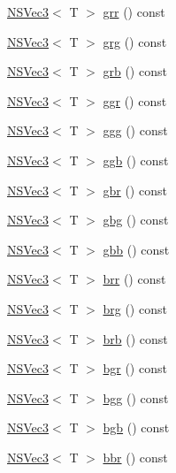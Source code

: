 \begin{DoxyCompactItemize}
\item 
\hyperlink{structNSVec3}{N\-S\-Vec3}$<$ T $>$ \hyperlink{structNSVec3_addbc52814a2aef9949cc2ff4ddc6ba97}{grr} () const 
\item 
\hyperlink{structNSVec3}{N\-S\-Vec3}$<$ T $>$ \hyperlink{structNSVec3_aea835c378065a68c2279c1ec5879f0b4}{grg} () const 
\item 
\hyperlink{structNSVec3}{N\-S\-Vec3}$<$ T $>$ \hyperlink{structNSVec3_a9a398119dc7c29f05c1844c232353f1d}{grb} () const 
\item 
\hyperlink{structNSVec3}{N\-S\-Vec3}$<$ T $>$ \hyperlink{structNSVec3_a94b3cd4633e9a3a47e2d1785446600b8}{ggr} () const 
\item 
\hyperlink{structNSVec3}{N\-S\-Vec3}$<$ T $>$ \hyperlink{structNSVec3_a790c174c59095fb40fd02d9382e29a25}{ggg} () const 
\item 
\hyperlink{structNSVec3}{N\-S\-Vec3}$<$ T $>$ \hyperlink{structNSVec3_add295dbe56bda5a4d633661183238b16}{ggb} () const 
\item 
\hyperlink{structNSVec3}{N\-S\-Vec3}$<$ T $>$ \hyperlink{structNSVec3_a5159f1ccd1faad4bad757819a5b29930}{gbr} () const 
\item 
\hyperlink{structNSVec3}{N\-S\-Vec3}$<$ T $>$ \hyperlink{structNSVec3_ae72e9d997d90ff3cdec0a55c97fa2745}{gbg} () const 
\item 
\hyperlink{structNSVec3}{N\-S\-Vec3}$<$ T $>$ \hyperlink{structNSVec3_aca3f87e3640573d7ace488c4b1bd4c27}{gbb} () const 
\item 
\hyperlink{structNSVec3}{N\-S\-Vec3}$<$ T $>$ \hyperlink{structNSVec3_a439db831b4883541748c3af1acf286e9}{brr} () const 
\item 
\hyperlink{structNSVec3}{N\-S\-Vec3}$<$ T $>$ \hyperlink{structNSVec3_aca534d8f65704a1e8df53e8f9ab48aff}{brg} () const 
\item 
\hyperlink{structNSVec3}{N\-S\-Vec3}$<$ T $>$ \hyperlink{structNSVec3_ade69823278092a1a55b7b64ac9e97b5b}{brb} () const 
\item 
\hyperlink{structNSVec3}{N\-S\-Vec3}$<$ T $>$ \hyperlink{structNSVec3_ae7bd2e1f4490f4991cfc222f70450828}{bgr} () const 
\item 
\hyperlink{structNSVec3}{N\-S\-Vec3}$<$ T $>$ \hyperlink{structNSVec3_aac661fa406ab8a160ff79baaa13036e6}{bgg} () const 
\item 
\hyperlink{structNSVec3}{N\-S\-Vec3}$<$ T $>$ \hyperlink{structNSVec3_a60c863aadd4d87ff4dc21eb001a80bda}{bgb} () const 
\item 
\hyperlink{structNSVec3}{N\-S\-Vec3}$<$ T $>$ \hyperlink{structNSVec3_a360f680f94dba6a93a1777edad5a5041}{bbr} () const 

\end{DoxyCompactItemize}
